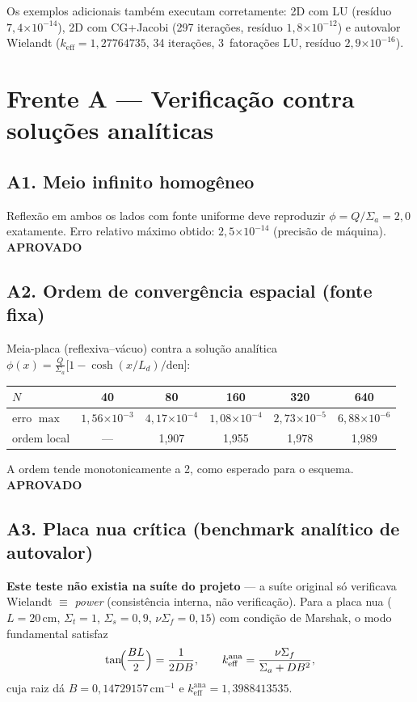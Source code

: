 \documentclass[11pt,a4paper]{article}
\newcommand{\keff}{k_{\text{eff}}}
\newcommand{\aprovado}{\textcolor{green!45!black}{\textbf{APROVADO}}}
\newcommand{\e}[1]{\ensuremath{\times 10^{#1}}}
\begin{document}
Os exemplos adicionais também executam corretamente: 2D com LU
(resíduo $7{,}4\e{-14}$), 2D com CG+Jacobi (297 iterações, resíduo
$1{,}8\e{-12}$) e autovalor Wielandt ($\keff = 1{,}27764735$, 34 iterações,
3~fatorações LU, resíduo $2{,}9\e{-16}$).

\section{Frente A --- Verificação contra soluções analíticas}

\subsection{A1. Meio infinito homogêneo}
Reflexão em ambos os lados com fonte uniforme deve reproduzir
$\phi = Q/\Sigma_a = 2{,}0$ exatamente. Erro relativo máximo obtido:
$2{,}5\e{-14}$ (precisão de máquina). \hfill \aprovado

\subsection{A2. Ordem de convergência espacial (fonte fixa)}
Meia-placa (reflexiva--vácuo) contra a solução analítica
$\phi(x) = \tfrac{Q}{\Sigma_a}\bigl[1 - \cosh(x/L_d)/\text{den}\bigr]$:

\begin{center}\small
\begin{tabular}{lccccc}
\toprule
$N$ & 40 & 80 & 160 & 320 & 640 \\
\midrule
erro $\max$ & $1{,}56\e{-3}$ & $4{,}17\e{-4}$ & $1{,}08\e{-4}$ & $2{,}73\e{-5}$ & $6{,}88\e{-6}$ \\
ordem local & --- & 1{,}907 & 1{,}955 & 1{,}978 & 1{,}989 \\
\bottomrule
\end{tabular}
\end{center}
A ordem tende monotonicamente a 2, como esperado para o esquema. \hfill \aprovado

\subsection{A3. Placa nua crítica (benchmark analítico de autovalor)}
\textbf{Este teste não existia na suíte do projeto} --- a suíte original só
verificava Wielandt $\equiv$ \emph{power} (consistência interna, não
verificação). Para a placa nua ($L=20$\,cm, $\Sigma_t=1$, $\Sigma_s=0{,}9$,
$\nu\Sigma_f=0{,}15$) com condição de Marshak, o modo fundamental satisfaz
\begin{equation}
\tan\!\Bigl(\frac{BL}{2}\Bigr) = \frac{1}{2DB},
\qquad
\keff^{\text{ana}} = \frac{\nu\Sigma_f}{\Sigma_a + DB^2},
\end{equation}
cuja raiz dá $B = 0{,}14729157$\,cm$^{-1}$ e
$\keff^{\text{ana}} = 1{,}3988413535$.
\end{document}
